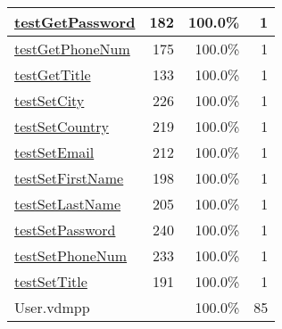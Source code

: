 \begin{longtable}{|l|r|r|r|}
\hyperref[testGetPassword:182]{testGetPassword} & 182&100.0\% & 1 \\
\hline
\hyperref[testGetPhoneNum:175]{testGetPhoneNum} & 175&100.0\% & 1 \\
\hline
\hyperref[testGetTitle:133]{testGetTitle} & 133&100.0\% & 1 \\
\hline
\hyperref[testSetCity:226]{testSetCity} & 226&100.0\% & 1 \\
\hline
\hyperref[testSetCountry:219]{testSetCountry} & 219&100.0\% & 1 \\
\hline
\hyperref[testSetEmail:212]{testSetEmail} & 212&100.0\% & 1 \\
\hline
\hyperref[testSetFirstName:198]{testSetFirstName} & 198&100.0\% & 1 \\
\hline
\hyperref[testSetLastName:205]{testSetLastName} & 205&100.0\% & 1 \\
\hline
\hyperref[testSetPassword:240]{testSetPassword} & 240&100.0\% & 1 \\
\hline
\hyperref[testSetPhoneNum:233]{testSetPhoneNum} & 233&100.0\% & 1 \\
\hline
\hyperref[testSetTitle:191]{testSetTitle} & 191&100.0\% & 1 \\
\hline
\hline
User.vdmpp & & 100.0\% & 85 \\
\hline
\end{longtable}

